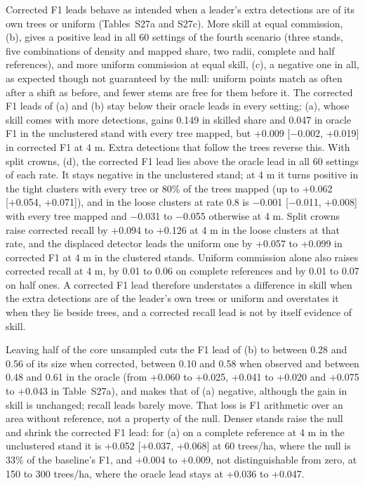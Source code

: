 \documentclass[10pt]{article}
\begin{document}
Corrected F1 leads behave as intended when a leader's extra detections are of
its own trees or uniform (Tables~S27a and S27c). More skill at equal commission,
(b), gives a positive lead in all 60 settings of the fourth scenario (three
stands, five combinations of density and mapped share, two radii, complete and
half references), and more uniform commission at equal skill, (c), a negative
one in all, as expected though not guaranteed by the null: uniform points match
as often after a shift as before, and fewer stems are free for them before it.
The corrected F1 leads of (a) and (b) stay below their oracle leads in every
setting; (a), whose skill comes with more detections, gains 0.149 in skilled
share and 0.047 in oracle F1 in the unclustered stand with every tree mapped,
but +0.009 [$-$0.002, +0.019] in corrected F1 at 4 m. Extra detections that follow
the trees reverse this. With split crowns, (d), the corrected F1 lead lies above
the oracle lead in all 60 settings of each rate. It stays negative in the
unclustered stand; at 4 m it turns positive in the tight clusters with every
tree or 80\% of the trees mapped (up to +0.062 [+0.054, +0.071]), and in the
loose clusters at rate 0.8 is $-$0.001 [$-$0.011, +0.008] with every tree mapped and
$-$0.031 to $-$0.055 otherwise at 4 m. Split crowns raise corrected recall by +0.094
to +0.126 at 4 m in the loose clusters at that rate, and the displaced detector
leads the uniform one by +0.057 to +0.099 in corrected F1 at 4 m in the
clustered stands. Uniform commission alone also raises corrected recall at 4 m,
by 0.01 to 0.06 on complete references and by 0.01 to 0.07 on half ones. A
corrected F1 lead therefore understates a difference in skill when the extra
detections are of the leader's own trees or uniform and overstates it when they
lie beside trees, and a corrected recall lead is not by itself evidence of
skill.

Leaving half of the core unsampled cuts the F1 lead of (b) to between 0.28 and
0.56 of its size when corrected, between 0.10 and 0.58 when observed and
between 0.48 and 0.61 in the oracle (from +0.060 to +0.025, +0.041 to +0.020
and +0.075 to +0.043 in Table~S27a), and makes that of (a) negative, although
the gain in skill is unchanged; recall leads barely move. That loss is F1
arithmetic over an area without reference, not a property of the null. Denser
stands raise the null and shrink the corrected F1 lead: for (a) on a complete
reference at 4 m in the unclustered stand it is +0.052 [+0.037, +0.068] at 60
trees/ha, where the null is 33\% of the baseline's F1, and +0.004 to +0.009, not
distinguishable from zero, at 150 to 300 trees/ha, where the oracle lead stays
at +0.036 to +0.047.
\end{document}
